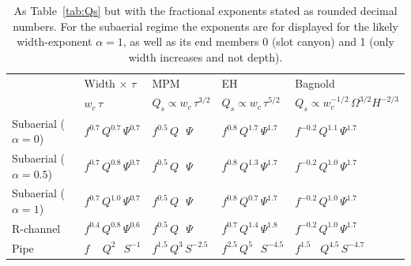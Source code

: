 \documentclass[draft]{agujournal2019}
\begin{document}
\begin{table}
  \caption{As Table~\ref{tab:Qs} but with the fractional exponents stated as rounded decimal numbers.  For the subaerial regime the exponents are for displayed for the likely width-exponent $\alpha=1$, as well as its end members 0 (slot canyon) and 1 (only width increases and not depth).
    }
  \label{tab:Qs2}
\begin{tabular}{lllll}
 & Width \(\times \,\, \tau\) & MPM & EH & Bagnold\\
 & \(w_c\, \tau\) & \(Q_s \propto w_c\, \tau^{3/2}\) & \(Q_s \propto w_c\, \tau^{5/2}\) & \(Q_s \propto w_c^{-1/2}\, \Omega^{3/2} H^{-2/3}\)\\
\hline
Subaerial (\(\alpha=0\)) & \(f^{0.7}\, Q^{0.7}\,  \Psi^{0.7}\) & \(f^{0.5}\, Q \,\,\,\, \Psi\) & \(f^{0.8}\, Q^{1.7} \, \Psi^{1.7}\) & \(f^{-0.2}\, Q^{1.1} \, \Psi^{1.7}\)\\
Subaerial (\(\alpha=0.5\)) & \(f^{0.7}\, Q^{0.8}\,  \Psi^{0.7}\) & \(f^{0.5}\, Q \,\,\,\, \Psi\) & \(f^{0.8}\, Q^{1.3} \, \Psi^{1.7}\) & \(f^{-0.2}\, Q^{1.0} \, \Psi^{1.7}\)\\
Subaerial (\(\alpha=1\)) & \(f^{0.7}\, Q^{1.0}\,  \Psi^{0.7}\) & \(f^{0.5}\, Q \,\,\,\, \Psi\) & \(f^{0.8}\, Q^{0.7} \, \Psi^{1.7}\) & \(f^{-0.2}\, Q^{1.0} \, \Psi^{1.7}\)\\[3pt]
R-channel & \(f^{0.4}\, Q^{0.8} \, \Psi^{0.6}\) & \(f^{0.5}\, Q \,\,\,\, \Psi\) & \(f^{0.7}\, Q^{1.4}\, \Psi^{1.8}\) & \(f^{-0.2}\, Q^{1.0} \, \Psi^{1.7}\)\\
Pipe & \(f \,\quad Q^{2\phantom{.0}} \, S^{-1}\) & \(f^{1.5}\, Q^3 \, S^{-2.5}\) & \(f^{2.5}\, Q^{5\phantom{.0}}\, S^{-4.5}\) & \(f^{1.5} \,\,\,\,\, Q^{4.5} \, S^{-4.7}\)\\
\end{tabular}
\end{table}
\end{document}
